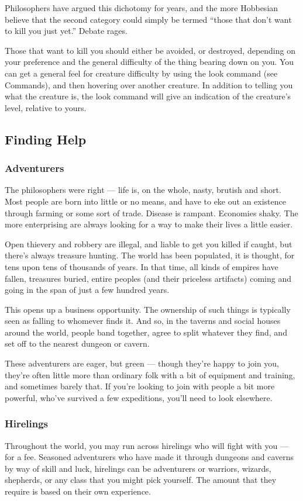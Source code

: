 Philosophers have argued this dichotomy for years, and the more Hobbesian
believe that the second category could simply be termed ``those that don't
want to kill you just yet.''  Debate rages.

Those that want to kill you should either be avoided, or destroyed,
depending on your preference and the general difficulty of the thing
bearing down on you.  You can get a general feel for creature difficulty
by using the look command (see Commands), and then hovering over another 
creature.  In addition to telling you what the creature is, the look 
command will give an indication of the creature's level, relative to yours.

\subsection{Finding Help}
\subsubsection{Adventurers}
The philosophers were right --- life is, on the whole, nasty, brutish and
short.  Most people are born into little or no means, and have to eke out an
existence through farming or some sort of trade.  Disease is rampant.
Economies shaky.  The more enterprising are always looking for a way to make
their lives a little easier.

Open thievery and robbery are illegal, and liable to get you killed if caught,
but there's always treasure hunting.  The world has been populated, it is
thought, for tens upon tens of thousands of years.  In that time, all kinds of
empires have fallen, treasures buried, entire peoples (and their priceless
artifacts) coming and going in the span of just a few hundred years.

This opens up a business opportunity.  The ownership of such things is typically
seen as falling to whomever finds it.  And so, in the taverns and social houses
around the world, people band together, agree to split whatever they find, and
set off to the nearest dungeon or cavern.  

These adventurers are eager, but green --- though they're happy to join you,
they're often little more than ordinary folk with a bit of equipment and 
training, and sometimes barely that.  If you're looking to join with people a 
bit more powerful, who've survived a few expeditions, you'll need to look 
elsewhere.

\subsubsection{Hirelings}
Throughout the world, you may run across hirelings who will fight with you ---
for a fee.  Seasoned adventurers who have made it through dungeons and caverns
by way of skill and luck, hirelings can be adventurers or warriors, wizards,
shepherds, or any class that you might pick yourself.  The amount that they
require is based on their own experience.

